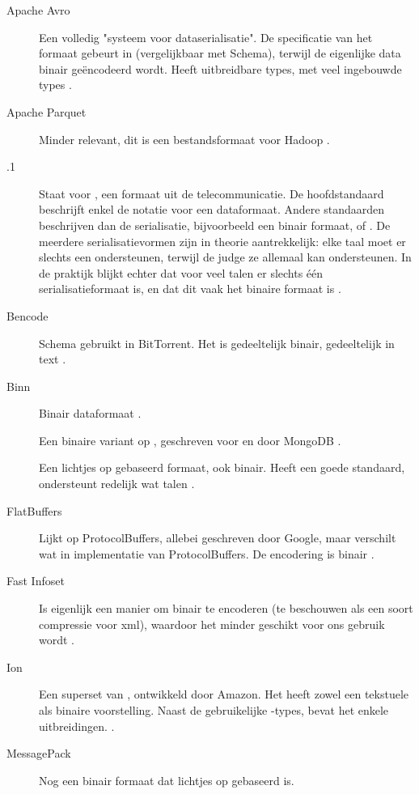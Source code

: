 \begin{description}
    \item[Apache Avro] Een volledig "systeem voor dataserialisatie".
    De specificatie van het formaat gebeurt in  (vergelijkbaar met  Schema), terwijl de eigenlijke data binair geëncodeerd wordt.
    Heeft uitbreidbare types, met veel ingebouwde types \autocite{avro}.
    \item[Apache Parquet] Minder relevant, dit is een bestandsformaat voor Hadoop \autocite{parquet}.
    \item[.1] Staat voor , een formaat uit de telecommunicatie.
    De hoofdstandaard beschrijft enkel de notatie voor een dataformaat.
    Andere standaarden beschrijven dan de serialisatie, bijvoorbeeld een binair formaat,  of .
    De meerdere serialisatievormen zijn in theorie aantrekkelijk: elke taal moet er slechts een ondersteunen, terwijl de judge ze allemaal kan ondersteunen.
    In de praktijk blijkt echter dat voor veel talen er slechts één serialisatieformaat is, en dat dit vaak het binaire formaat is \autocite{x680}.
    \item[Bencode] Schema gebruikt in BitTorrent.
    Het is gedeeltelijk binair, gedeeltelijk in text \autocite{cohen2017}.
    \item[Binn] Binair dataformaat \autocite{ramos2019}.
    \item[] Een binaire variant op , geschreven voor en door MongoDB \autocite{bson}.
    \item[] Een lichtjes op  gebaseerd formaat, ook binair.
    Heeft een goede standaard, ondersteunt redelijk wat talen \autocite{rfc7049}.
    \item[FlatBuffers] Lijkt op ProtocolBuffers, allebei geschreven door Google, maar verschilt wat in implementatie van ProtocolBuffers.
    De encodering is binair \autocite{flatbuffers}.
    \item[Fast Infoset] Is eigenlijk een manier om  binair te encoderen (te beschouwen als een soort compressie voor xml), waardoor het minder geschikt voor ons gebruik wordt \autocite{x981}.
    \item[Ion] Een superset van , ontwikkeld door Amazon.
    Het heeft zowel een tekstuele als binaire voorstelling.
    Naast de gebruikelijke -types, bevat het enkele uitbreidingen. \autocite{ion}.
    \item[MessagePack] Nog een binair formaat dat lichtjes op  gebaseerd is.

\end{description}
